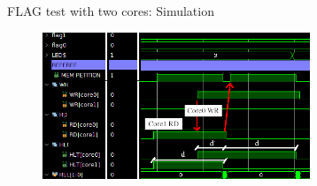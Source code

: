 
\begin{frame}{FLAG test with two cores: Simulation}
\begin{figure}
    \centering
    \includegraphics[width=8cm]{images/flag2_sim_close_arrow.png}
    \label{fig:my_label2}
\end{figure}
\end{frame}


